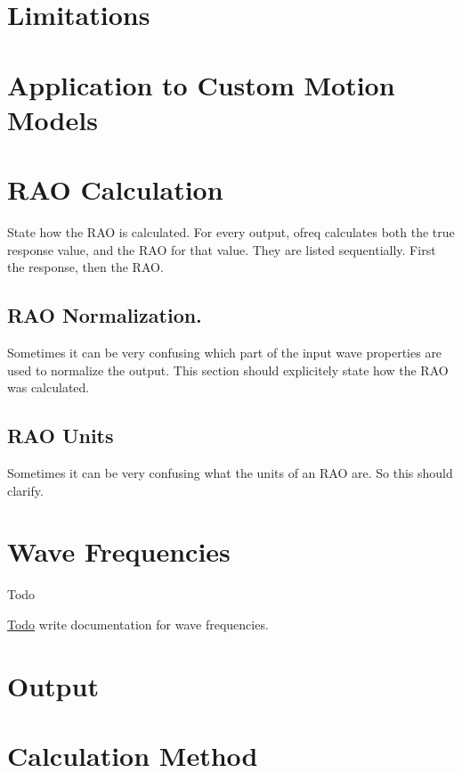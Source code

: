 \section*{Limitations}

\section*{Application to Custom Motion Models}

\section*{R\-A\-O Calculation}

State how the R\-A\-O is calculated. For every output, ofreq calculates both the true response value, and the R\-A\-O for that value. They are listed sequentially. First the response, then the R\-A\-O.

\subsection*{R\-A\-O Normalization.}

Sometimes it can be very confusing which part of the input wave properties are used to normalize the output. This section should explicitely state how the R\-A\-O was calculated.

\subsection*{R\-A\-O Units}

Sometimes it can be very confusing what the units of an R\-A\-O are. So this should clarify. \hypertarget{wave_frequencies}{}\section{Wave Frequencies}\label{wave_frequencies}
\begin{DoxyRefDesc}{Todo}
\item[\hyperlink{todo__todo000026}{Todo}]write documentation for wave frequencies. \end{DoxyRefDesc}


\section*{Output}

\section*{Calculation Method}

